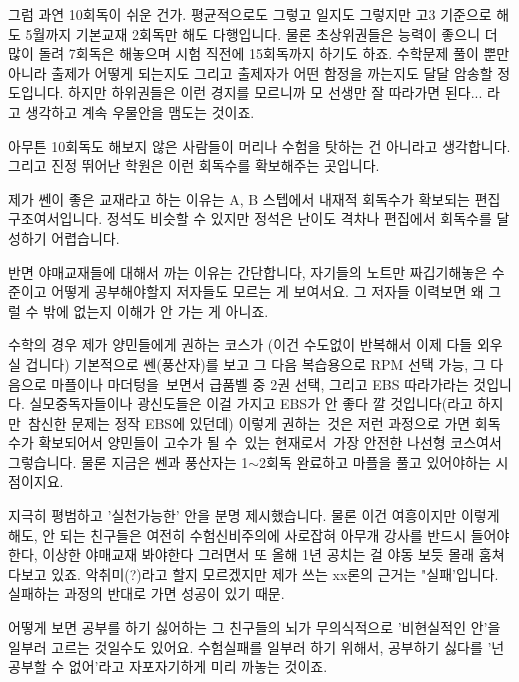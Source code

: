 그럼 과연 10회독이 쉬운 건가.
평균적으로도 그렇고 일지도 그렇지만 고3 기준으로 해도 5월까지 기본교재 2회독만 해도 다행입니다.
물론 초상위권들은 능력이 좋으니 더 많이 돌려 7회독은 해놓으며 시험 직전에 15회독까지 하기도 하죠.
수학문제 풀이 뿐만 아니라 출제가 어떻게 되는지도 그리고 출제자가 어떤 함정을 까는지도 달달 암송할 정도입니다.
하지만 하위권들은 이런 경지를 모르니까 모 선생만 잘 따라가면 된다... 라고 생각하고 계속 우물안을 맴도는 것이죠.
\vspace{5mm}

아무튼 10회독도 해보지 않은 사람들이 머리나 수험을 탓하는 건 아니라고 생각합니다.
그리고 진정 뛰어난 학원은 이런 회독수를 확보해주는 곳입니다.
\vspace{5mm}

제가 쎈이 좋은 교재라고 하는 이유는 A, B 스텝에서 내재적 회독수가 확보되는 편집구조여서입니다.
정석도 비슷할 수 있지만 정석은 난이도 격차나 편집에서 회독수를 달성하기 어렵습니다.
\vspace{5mm}

반면 야매교재들에 대해서 까는 이유는 간단합니다,
자기들의 노트만 짜깁기해놓은 수준이고 어떻게 공부해야할지 저자들도 모르는 게 보여서요.
그 저자들 이력보면 왜 그럴 수 밖에 없는지 이해가 안 가는 게 아니죠.
\vspace{5mm}

수학의 경우 제가 양민들에게 권하는 코스가 (이건 수도없이 반복해서 이제 다들 외우실 겁니다)
기본적으로 쎈(풍산자)를 보고 그 다음 복습용으로 RPM 선택 가능,
그 다음으로 마플이나 마더텅을 보면서 급품벨 중 2권 선택, 그리고 EBS 따라가라는 것입니다.
실모중독자들이나 광신도들은 이걸 가지고 EBS가 안 좋다 깔 것입니다(라고 하지만 참신한 문제는 정작 EBS에 있던데)
이렇게 권하는 것은 저런 과정으로 가면 회독수가 확보되어서 양민들이 고수가 될 수 있는 현재로서 가장 안전한 나선형 코스여서 그렇습니다.
물론 지금은 쎈과 풍산자는 1$\sim$2회독 완료하고 마플을 풀고 있어야하는 시점이지요.
\vspace{5mm}

지극히 평범하고 '실천가능한' 안을 분명 제시했습니다.
물론 이건 여흥이지만 이렇게 해도, 안 되는 친구들은 여전히 수험신비주의에 사로잡혀
아무개 강사를 반드시 들어야 한다, 이상한 야매교재 봐야한다 그러면서 또 올해 1년 공치는 걸 야동 보듯 몰래 훔쳐다보고 있죠.
악취미(?)라고 할지 모르겠지만 제가 쓰는 xx론의 근거는 "실패'입니다. 실패하는 과정의 반대로 가면 성공이 있기 때문.
\vspace{5mm}

어떻게 보면 공부를 하기 싫어하는 그 친구들의 뇌가 무의식적으로 '비현실적인 안'을 일부러 고르는 것일수도 있어요.
수험실패를 일부러 하기 위해서, 공부하기 싫다를 '넌 공부할 수 없어'라고 자포자기하게 미리 까놓는 것이죠.
\vspace{5mm}






